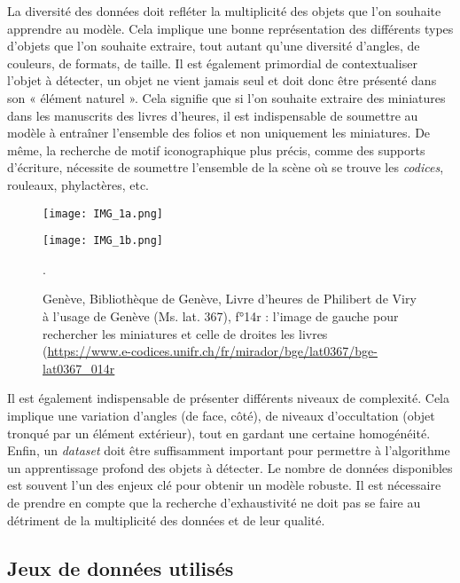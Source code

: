 \documentclass[12pt,twoside]{book}
\begin{document}
\newpage
La diversité des données doit refléter la multiplicité des objets que l’on souhaite apprendre au modèle. Cela implique une bonne représentation des différents types d’objets que l’on souhaite extraire, tout autant qu’une diversité d’angles, de couleurs, de formats, de taille. Il est également primordial de contextualiser l’objet à détecter, un objet ne vient jamais seul et doit donc être présenté dans son « élément naturel ». Cela signifie que si l’on souhaite extraire des miniatures dans les manuscrits des livres d’heures, il est indispensable de soumettre au modèle à entraîner l’ensemble des folios et non uniquement les miniatures. De même, la recherche de motif iconographique plus précis, comme des supports d’écriture, nécessite de soumettre l’ensemble de la scène où se trouve les \textit{codices}, rouleaux, phylactères, etc.

\begin{figure}[h]
    \centering
    \begin{minipage}[b]{0.45\textwidth}
        \centering
        \texttt{[image: IMG\_1a.png]}
    \end{minipage}
    \hfill
    \begin{minipage}[b]{0.45\textwidth}
        \centering
        \texttt{[image: IMG\_1b.png]}
    \end{minipage}
    \caption{Genève, Bibliothèque de Genève, Livre d’heures de Philibert de Viry à l’usage de Genève (Ms. lat. 367), f°14r : l’image de gauche pour rechercher les miniatures et celle de droites les livres (\url{https://www.e-codices.unifr.ch/fr/mirador/bge/lat0367/bge-lat0367_014r}}.
\end{figure}

Il est également indispensable de présenter différents niveaux de complexité. Cela implique une variation d’angles (de face, côté), de niveaux d’occultation (objet tronqué par un élément extérieur), tout en gardant une certaine homogénéité. \\

Enfin, un \textit{dataset} doit être suffisamment important pour permettre à l'algorithme un apprentissage profond des objets à détecter. Le nombre de données disponibles est souvent l’un des enjeux clé pour obtenir un modèle robuste. Il est nécessaire de prendre en compte que la recherche d’exhaustivité ne doit pas se faire au détriment de la multiplicité des données et de leur qualité. 

\subsection{Jeux de données utilisés}
\end{document}
